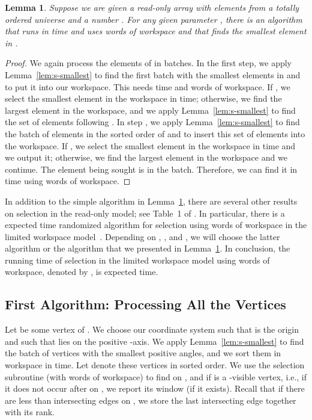\documentclass[11pt, a4paper]{article}
\newtheorem{lem}[theorem1]{Lemma}{\bfseries}{\itshape}
\begin{document}
\begin{lem}\label{lem:k-selection}
Suppose we are given a read-only array  with  elements from 
a totally ordered universe and a number . 
For any given parameter , there is an 
algorithm that runs in  time and uses 
 words of workspace and that finds the  smallest 
element in .
\end{lem}
\begin{proof}
We  again process the elements of  in batches.
In the first step, we apply Lemma~\ref{lem:s-smallest} to find the 
first batch with the  smallest elements in  and to put it into 
our workspace. This needs  time and  words of workspace. 
If , we select the  smallest element in the 
workspace in  time; otherwise, we find the largest element  
in the workspace, and we apply Lemma~\ref{lem:s-smallest} to find 
the set of  elements following . In step , we apply 
Lemma~\ref{lem:s-smallest} to find
the  batch of  elements 
in the sorted order of  and to insert this set of elements into the workspace. 
If , we select the  smallest 
element in the workspace in  time and we output it; otherwise, 
we find the largest element in the workspace and we continue. 
The element being sought is in the  
batch. Therefore, we can find it in 
 time using  words of workspace.
\end{proof}

In addition to the simple algorithm in Lemma~\ref{lem:k-selection}, 
there are several other results on selection in the read-only model; 
see Table~1 of \cite{chan2014selection}. In particular, there is a
 expected time randomized algorithm for 
selection using  words of workspace in the 
limited workspace model~\cite{chan2010comparison,munro1996selection}. 
Depending 
on , , and , we will choose the latter algorithm or 
the algorithm that we presented in Lemma~\ref{lem:k-selection}. 
In conclusion, the running time of selection in the 
limited workspace model using  words of workspace, 
denoted by , is 
 expected time. 

\subsection{First Algorithm: Processing All the Vertices}\label{sec:algo1}

Let  be some vertex of . 
We choose our coordinate system such that
 is the origin and such that  lies on the positive -axis.
We apply Lemma~\ref{lem:s-smallest} to find the batch of  
vertices with the smallest positive angles, and we 
sort them in workspace in  time. Let  
denote these vertices in sorted order. We use the 
selection subroutine (with  words of workspace) to find 
 on , and if  is a -visible vertex, i.e., if 
it does not occur after  on , we report
its window (if it exists).  Recall that if there are less than 
intersecting edges on , we store the last intersecting edge 
together with its rank.
\end{document}
